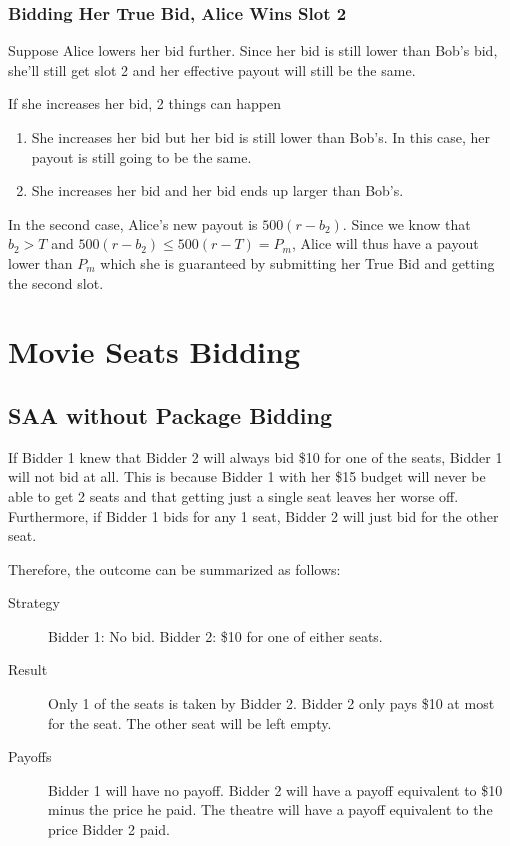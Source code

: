 \documentclass[]{article}
\begin{document}
\subsubsection*{Bidding Her True Bid, Alice Wins Slot 2}

Suppose Alice lowers her bid further. Since her bid is still lower than Bob's bid, she'll still get slot 2 and her effective payout will still be the same. 

If she increases her bid, 2 things can happen

\begin{enumerate}
	\item She increases her bid but her bid is still lower than Bob's.  In this case, her payout is still going to be the same.
	\item She increases her bid and her bid ends up larger than Bob's.
\end{enumerate}

In the second case, Alice's new payout is $500(r - b_2)$. Since we know that $b_2 > T$ and $500(r - b_2) \leq 500(r - T) = P_m$, Alice will thus have a payout lower than $P_m$ which she is guaranteed by submitting her True Bid and getting the second slot.

\newpage
\section{Movie Seats Bidding}
\subsection{SAA without Package Bidding}

If Bidder 1 knew that Bidder 2 will always bid \$10 for one of the seats, Bidder 1 will not bid at all. This is because Bidder 1 with her \$15 budget will never be able to get 2 seats and that getting just a single seat leaves her worse off. Furthermore, if Bidder 1 bids for any 1 seat, Bidder 2 will just bid for the other seat.

Therefore, the outcome can be summarized as follows:
\begin{description}
	\item[Strategy] Bidder 1: No bid. Bidder 2: \$10 for one of either seats.
	\item[Result] Only 1 of the seats is taken by Bidder 2. Bidder 2 only pays \$10 at most for the seat. The other seat will be left empty. 
	\item[Payoffs] Bidder 1 will have no payoff. Bidder 2 will have a payoff equivalent to \$10 minus the price he paid. The theatre will have a payoff equivalent to the price Bidder 2 paid.
\end{description}
\end{document}
